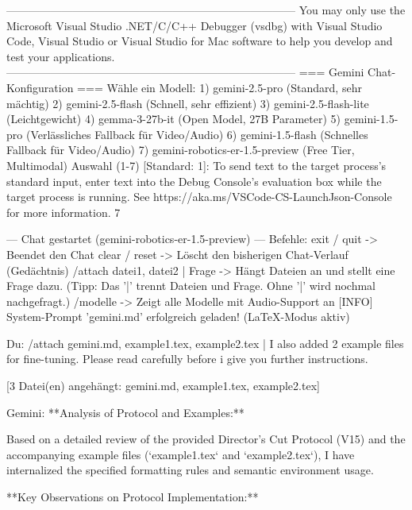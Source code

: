 ------------------------------------------------------------------------------
You may only use the Microsoft Visual Studio .NET/C/C++ Debugger (vsdbg) with
Visual Studio Code, Visual Studio or Visual Studio for Mac software to help you
develop and test your applications.
------------------------------------------------------------------------------
=== Gemini Chat-Konfiguration ===
Wähle ein Modell:
1) gemini-2.5-pro       (Standard, sehr mächtig)
2) gemini-2.5-flash     (Schnell, sehr effizient)
3) gemini-2.5-flash-lite (Leichtgewicht)
4) gemma-3-27b-it       (Open Model, 27B Parameter)
5) gemini-1.5-pro       (Verlässliches Fallback für Video/Audio)
6) gemini-1.5-flash     (Schnelles Fallback für Video/Audio)
7) gemini-robotics-er-1.5-preview (Free Tier, Multimodal)
Auswahl (1-7) [Standard: 1]:
To send text to the target process's standard input, enter text into the Debug Console's evaluation box while the target process is running. See https://aka.ms/VSCode-CS-LaunchJson-Console for more information.
7


--- Chat gestartet (gemini-robotics-er-1.5-preview) ---
Befehle:
  exit / quit               -> Beendet den Chat
  clear / reset             -> Löscht den bisherigen Chat-Verlauf (Gedächtnis)
  /attach datei1, datei2 | Frage -> Hängt Dateien an und stellt eine Frage dazu.
                             (Tipp: Das '|' trennt Dateien und Frage. Ohne '|' wird nochmal nachgefragt.)
  /modelle                  -> Zeigt alle Modelle mit Audio-Support an
  [INFO] System-Prompt 'gemini.md' erfolgreich geladen! (LaTeX-Modus aktiv)

Du:
/attach gemini.md, example1.tex, example2.tex | I also added 2 example files for fine-tuning. Please read carefully before i give you further instructions.

[3 Datei(en) angehängt: gemini.md, example1.tex, example2.tex]

Gemini:
**Analysis of Protocol and Examples:**

Based on a detailed review of the provided Director's Cut Protocol (V15) and the accompanying example files (`example1.tex` and `example2.tex`), I have internalized the specified formatting rules and semantic environment usage.

**Key Observations on Protocol Implementation:**

